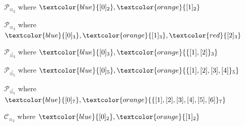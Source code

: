 \documentclass[10pt,serif, professionalfont]{beamer}
\begin{document}

\begin{frame}{$\mathcal{P}_{\equiv_{2}}$ where 
    $\textcolor{blue}{[0]_{2}},\textcolor{orange}{[1]_{2}}$}

    
\end{frame}

\begin{frame}{$\mathcal{P}_{\equiv_{3}}$ where 
    $\textcolor{blue}{[0]_{3}},\textcolor{orange}{[1]_{3}},\textcolor{red}{[2]_{3}}$}

    
\end{frame}
\begin{frame}{$\mathcal{P}_{\stackrel{\circ}{\equiv_{3}}}$ where 
    $\textcolor{blue}{[0]_{3}},\textcolor{orange}{\lbrace [1],[2] \rbrace_{3}}$}

    
\end{frame}
\begin{frame}{$\mathcal{P}_{\stackrel{\circ}{\equiv_{5}}}$ where 
    $\textcolor{blue}{[0]_{5}},\textcolor{orange}{\lbrace [1],[2],[3],[4] \rbrace_{5}}$}

    
\end{frame}
\begin{frame}{$\mathcal{P}_{\stackrel{\circ}{\equiv_{7}}}$ where 
    $\textcolor{blue}{[0]_{7}},\textcolor{orange}{\lbrace [1],[2],[3],[4],[5],[6] \rbrace_{7}}$}

    
\end{frame}



\begin{frame}{$\mathcal{C}_{\equiv_{2}}$ where 
    $\textcolor{blue}{[0]_{2}},\textcolor{orange}{[1]_{2}}$}

    
\end{frame}
\end{document}
